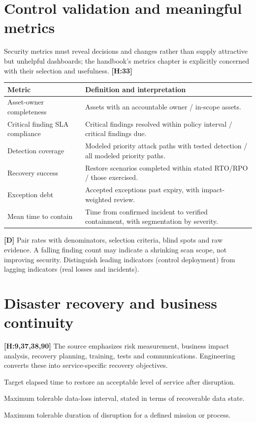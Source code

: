\documentclass[10pt,letterpaper,oneside]{article}
\newcommand{\handbookref}[1]{\textsf{\color{accent}\textbf{[H:#1]}}}
\newcommand{\designed}{\textsf{\color{accent}\textbf{[D]}}}
\begin{document}
\section{Control validation and meaningful metrics}
Security metrics must reveal decisions and changes rather than supply attractive but unhelpful dashboards; the handbook's metrics chapter is explicitly concerned with their selection and usefulness. \handbookref{33}
\par\medskip\noindent\begin{tabularx}{\textwidth}{@{}p{}X@{}}\toprule
Metric & Definition and interpretation \\ \midrule
Asset-owner completeness & Assets with an accountable owner / in-scope assets.\\
Critical finding SLA compliance & Critical findings resolved within policy interval / critical findings due.\\
Detection coverage & Modeled priority attack paths with tested detection / all modeled priority paths.\\
Recovery success & Restore scenarios completed within stated RTO/RPO / those exercised.\\
Exception debt & Accepted exceptions past expiry, with impact-weighted review.\\
Mean time to contain & Time from confirmed incident to verified containment, with segmentation by severity.\\
\bottomrule\end{tabularx}\par\medskip
\designed{} Pair rates with denominators, selection criteria, blind spots and raw evidence. A falling finding count may indicate a shrinking scan scope, not improving security. Distinguish leading indicators (control deployment) from lagging indicators (real losses and incidents).

\section{Disaster recovery and business continuity}
\handbookref{9,37,38,90} The source emphasizes risk measurement, business impact analysis, recovery planning, training, tests and communications. Engineering converts these into service-specific recovery objectives.
\begin{description}[leftmargin=1.6em,style=nextline]
\item[RTO] Target elapsed time to restore an acceptable level of service after disruption.
\item[RPO] Maximum tolerable data-loss interval, stated in terms of recoverable data state.
\item[MTD / MTPD] Maximum tolerable duration of disruption for a defined mission or process.
\end{description}
\end{document}
